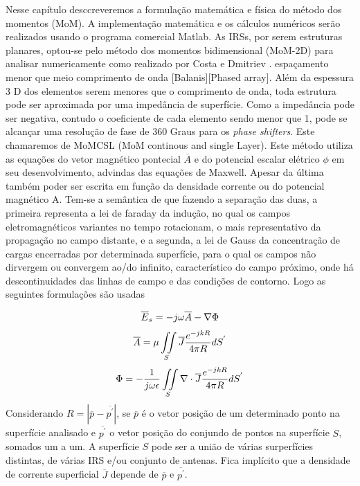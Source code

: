 \documentclass[
	12pt,				%
	openright,			%
	oneside,			%
	a4papey79r,			%
	english,			%
	brazil				%
	]{abntex2}
\begin{document}
Nesse capítulo desccreveremos a formulação matemática e física do método dos momentos (MoM). A implementação matemática e os cálculos numéricos serão realizados usando o programa comercial Matlab. As IRSs, por serem estruturas planares, optou-se pelo método dos momentos bidimensional (MoM-2D) para analisar numericamente como realizado por Costa e Dmitriev . 
espaçamento menor que meio comprimento de onda [Balanis][Phased array]. Além da espessura 3 D dos elementos serem menores que o comprimento de onda, toda estrutura pode ser aproximada por uma impedância de superfície. Como a impedância pode ser negativa, contudo o coeficiente de cada elemento sendo menor que 1, pode se alcançar uma resolução de fase de 360 Graus para os  \emph{phase shifters}. Este chamaremos de MoMCSL (MoM continous and single Layer). Este método utiliza as equações do vetor magnético pontecial $\overline{A}$ e do potencial escalar elétrico $\phi$ em seu desenvolvimento, advindas das equações de Maxwell. Apesar da última também poder ser escrita em função da densidade corrente ou do potencial magnético A. Tem-se a semântica de que fazendo a separação das duas, a primeira representa a lei de faraday da indução, no qual os campos eletromagnéticos variantes no tempo rotacionam, o mais representativo da propagação no campo distante, e a segunda, a lei de Gauss da concentração de cargas encerradas por determinada superfície, para o qual os campos não dirvergem ou convergem ao/do infinito, característico do campo próximo, onde há descontinuidades das linhas de campo e das condições de contorno. Logo as seguintes formulações são usadas


\begin{equation}{\label{CampoEspalhado}}
  \overline{E}_{s}=-j\omega \overline{A} - \nabla \Phi
\end{equation}
\begin{equation}{\label{VetorPotencialMagnetico}}
  \overline{A} =\mu \iint\limits_S\overline{J} \frac{e^{-j k R}}{4 \pi R} dS^{'}
  \end{equation}
\begin{equation}{\label{PotencialEscalar}}
  \Phi =-\frac{1}{j\omega \epsilon}\iint\limits_S \nabla \cdot \overline{J}\frac{e^{-j k R}}{4 \pi R} dS^{'}
  \end{equation}
Considerando $R=|\overline{p}-\overline{p^{'}}|$,  se $\overline{p}$ é o vetor posição de um determinado ponto na superfície  analisado e $\overline{p^{'}}$ o vetor posição do conjundo de pontos na superfície $S$, somados um a um. A superfície $S$ pode ser a união de várias surperfícies distintas, de várias IRS e/ou conjunto de antenas. Fica implícito que a densidade de corrente superficial $\overline{J}$ depende de $\overline{p}$ e $\overline{p^{'}}$. 
\end{document}
